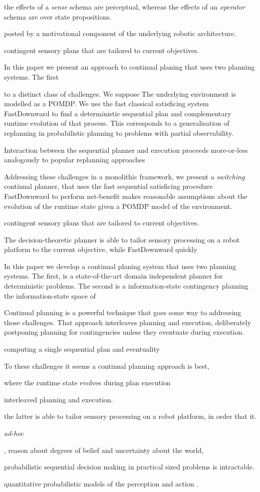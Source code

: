 the effects of a {\em sense} schema are perceptual, whereas the
effects of an {\em operator} schema are over state propositions.




posted by a motivational component of the underlying robotic
architecture. 

contingent sensory plans that are tailored to current
objectives.

In this paper we present an approach to continual planing that uses
two planning systems. The first 

 to a distinct class of
challenges. We suppose 
The underlying environment is modelled as a POMDP. We use the fast
classical satisficing system FastDownward to find a deterministic
sequential plan and complementary runtime evolution of that
process. This corresponds to a generalisation of replanning in
probabilistic planning to problems with partial observability.

Interaction between the sequential planner and execution proceeds
more-or-less analogously to popular replanning approaches

Addressing these challenges in a monolithic framework, we present a
{\em switching} continual planner, that uses the fast sequential
satisficing procedure FastDownward to perform net-benefit
makes reasonable assumptions about the evolution of the runtime state
given a POMDP model of the environment. 

contingent sensory plans that are tailored to current
objectives.


The decision-theoretic planner is able to tailor sensory processing on
a robot platform to the current objective, while FastDownward  quickly 


In this paper we develop a continual planing system that uses two
planning systems. The first, is a state-of-the-art domain independent
planner for deterministic problems. The second is a information-state
contingency planning the information-state space of 


Continual planning is a powerful technique that goes some way to
addressing those challenges. That approach interleaves planning and
execution, deliberately postponing planning for contingencies unless
they eventuate during execution. 


computing a single sequential plan and
eventuality



To these challenges it seems a continual planning approach is best, 

where the runtime state evolves during plan execution 


interleaved planning and execution. 

the latter is able to tailor sensory processing on a robot platform,
in order that it.

{\em ad-hoc} 

, reason about degrees of belief and uncertainty about the world, 

probabilistic sequential decision making in practical sized problems
is intractable.

quantitative probabilistic models of the perception and action .
